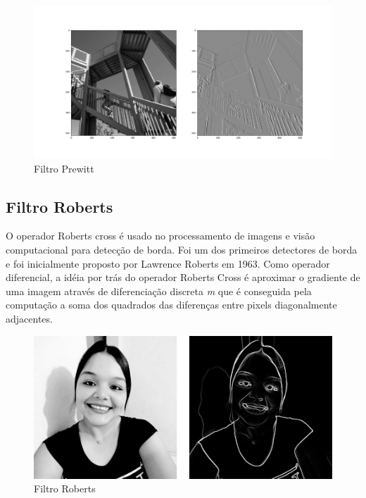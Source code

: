 		\begin{figure}[!htb]
			\centering
			\includegraphics[width=\textwidth]{img/11-prewitt.png}
			\caption{Filtro Prewitt}
		\end{figure}
	
		\lstset{language=python}
		{\tiny }
		
	\subsection{Filtro Roberts}
		O operador Roberts cross é usado no processamento de imagens e visão computacional para detecção de borda. Foi um dos primeiros detectores de borda e foi inicialmente proposto por Lawrence Roberts em 1963. Como operador diferencial, a idéia por trás do operador Roberts Cross é aproximar o gradiente de uma imagem através de diferenciação discreta \textit{m} que é conseguida pela computação a soma dos quadrados das diferenças entre pixels diagonalmente adjacentes.

		\begin{figure}[!htb]
			\centering
			\includegraphics[width=\textwidth]{img/12-roberts.jpg}
			\caption{Filtro Roberts}
		\end{figure}
		
